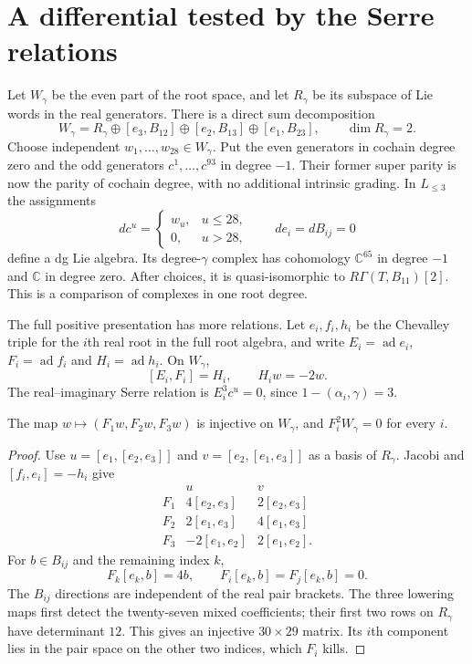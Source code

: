 \section{A differential tested by the Serre relations}
\label{cyprim:sec:Serre}

Let $W_\gamma$ be the even part of the root space, and let
$R_\gamma$ be its subspace of Lie words in the real generators.
There is a direct sum decomposition
\[
 W_\gamma=R_\gamma\oplus
       [e_3,B_{12}]\oplus[e_2,B_{13}]\oplus[e_1,B_{23}],
 \qquad \dim R_\gamma=2.
\]
Choose independent $w_1,\ldots,w_{28}\in W_\gamma$.
Put the even generators in cochain degree zero and the
odd generators $c^1,\ldots,c^{93}$ in degree $-1$.
Their former super parity is now the parity of cochain
degree, with no additional intrinsic grading.
In $L_{\le3}$ the assignments
\begin{equation}\label{cyprim:eq:rank28}
 dc^u=\begin{cases}w_u,&u\le28,\\0,&u>28,\end{cases}
 \qquad de_i=dB_{ij}=0
\end{equation}
define a dg Lie algebra. Its degree-$\gamma$ complex has
cohomology $\mathbb C^{65}$ in degree $-1$ and $\mathbb C$
in degree zero. After choices, it is quasi-isomorphic to
$R\Gamma(T,B_{11})[2]$. This is a comparison of complexes
in one root degree.

The full positive presentation has more relations. Let
$e_i,f_i,h_i$ be the Chevalley triple for the $i$th real
root in the full root algebra, and write
$E_i=\operatorname{ad}e_i$, $F_i=\operatorname{ad}f_i$ and
$H_i=\operatorname{ad}h_i$. On $W_\gamma$,
\[
 [E_i,F_i]=H_i,\qquad H_iw=-2w.
\]
The real--imaginary Serre relation is $E_i^3c^u=0$, since
$1-(\alpha_i,\gamma)=3$.

\begin{lemma}\label{cyprim:lem:lowering}
The map $w\mapsto(F_1w,F_2w,F_3w)$ is injective on
$W_\gamma$, and $F_i^2W_\gamma=0$ for every $i$.
\end{lemma}

\begin{proof}
Use $u=[e_1,[e_2,e_3]]$ and $v=[e_2,[e_1,e_3]]$ as a
basis of $R_\gamma$. Jacobi and $[f_i,e_i]=-h_i$ give
\[
\begin{array}{c|cc}
 &u&v\\\hline
 F_1&4[e_2,e_3]&2[e_2,e_3]\\
 F_2&2[e_1,e_3]&4[e_1,e_3]\\
 F_3&-2[e_1,e_2]&2[e_1,e_2].
\end{array}
\]
For $b\in B_{ij}$ and the remaining index $k$,
\[
 F_k[e_k,b]=4b,\qquad F_i[e_k,b]=F_j[e_k,b]=0.
\]
The $B_{ij}$ directions are independent of the real pair
brackets. The three lowering maps first detect the twenty-seven
mixed coefficients; their first two rows on $R_\gamma$ have
determinant $12$. This gives an injective $30\times29$ matrix.
Its $i$th component lies in the pair space on the other two
indices, which $F_i$ kills.
\end{proof}

